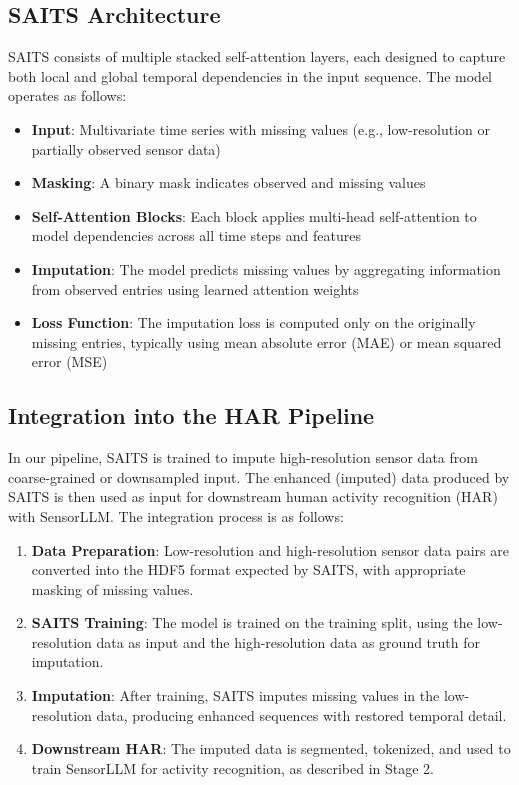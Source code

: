 \subsection{SAITS Architecture}

\hspace{2em}SAITS consists of multiple stacked self-attention layers, each designed to capture both local and global temporal dependencies in the input sequence. The model operates as follows:

\begin{itemize}
    \item \textbf{Input}: Multivariate time series with missing values (e.g., low-resolution or partially observed sensor data)
    \item \textbf{Masking}: A binary mask indicates observed and missing values
    \item \textbf{Self-Attention Blocks}: Each block applies multi-head self-attention to model dependencies across all time steps and features
    \item \textbf{Imputation}: The model predicts missing values by aggregating information from observed entries using learned attention weights
    \item \textbf{Loss Function}: The imputation loss is computed only on the originally missing entries, typically using mean absolute error (MAE) or mean squared error (MSE)
\end{itemize}

\subsection{Integration into the HAR Pipeline}

\hspace{2em}In our pipeline, SAITS is trained to impute high-resolution sensor data from coarse-grained or downsampled input. The enhanced (imputed) data produced by SAITS is then used as input for downstream human activity recognition (HAR) with SensorLLM. The integration process is as follows:

\begin{enumerate}
    \item \textbf{Data Preparation}: Low-resolution and high-resolution sensor data pairs are converted into the HDF5 format expected by SAITS, with appropriate masking of missing values.
    \item \textbf{SAITS Training}: The model is trained on the training split, using the low-resolution data as input and the high-resolution data as ground truth for imputation.
    \item \textbf{Imputation}: After training, SAITS imputes missing values in the low-resolution data, producing enhanced sequences with restored temporal detail.
    \item \textbf{Downstream HAR}: The imputed data is segmented, tokenized, and used to train SensorLLM for activity recognition, as described in Stage 2.
\end{enumerate}

